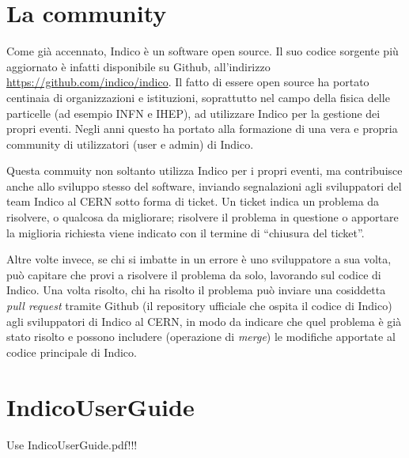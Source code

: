 	\section{La community} \label{sec:i;community}
	
		Come già accennato,  Indico è un software open source. Il suo codice sorgente più aggiornato è infatti disponibile su Github, all'indirizzo \url{https://github.com/indico/indico}. Il fatto di essere open source ha portato centinaia di organizzazioni e istituzioni, soprattutto nel campo della fisica delle particelle (ad esempio \acs{INFN} e \acs{IHEP}), ad utilizzare Indico per la gestione dei propri eventi. Negli anni questo ha portato alla formazione di una vera e propria community di utilizzatori (user e admin) di Indico.
		
		Questa commuity non soltanto utilizza Indico per i propri eventi, ma contribuisce anche allo sviluppo stesso del software,  inviando segnalazioni agli sviluppatori del team Indico  al \ac{CERN} sotto forma di ticket. Un ticket indica un problema da risolvere, o qualcosa da migliorare; risolvere il problema in questione o apportare la miglioria richiesta viene indicato con il termine di ``chiusura del ticket''.
		
		Altre volte invece, se chi si imbatte in un errore è uno sviluppatore a sua volta, può capitare che provi a risolvere il problema da solo, lavorando sul codice di Indico. Una volta  risolto, chi ha risolto il problema può inviare una cosiddetta \textit{pull request} tramite Github (il repository ufficiale che ospita il codice di Indico) agli sviluppatori di Indico al \ac{CERN}, in modo da indicare che  quel  problema è già stato risolto e possono includere (operazione di \textit{merge}) le modifiche apportate al codice principale di Indico.
		
    \section{IndicoUserGuide}
        Use IndicoUserGuide.pdf!!!
	